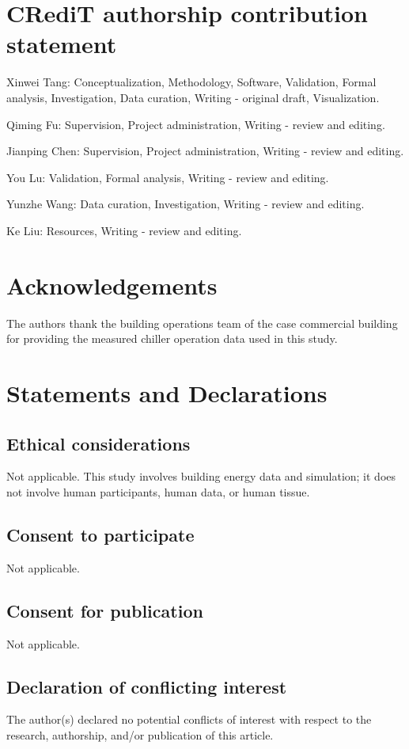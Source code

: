 \documentclass[preprint,12pt,number]{elsarticle}
\begin{document}
\section*{CRediT authorship contribution statement}
Xinwei Tang: Conceptualization, Methodology, Software, Validation, Formal analysis, Investigation, Data curation, Writing - original draft, Visualization.

Qiming Fu: Supervision, Project administration, Writing - review and editing.

Jianping Chen: Supervision, Project administration, Writing - review and editing.

You Lu: Validation, Formal analysis, Writing - review and editing.

Yunzhe Wang: Data curation, Investigation, Writing - review and editing.

Ke Liu: Resources, Writing - review and editing.

\section*{Acknowledgements}
The authors thank the building operations team of the case commercial building for providing the measured chiller operation data used in this study.

\section*{Statements and Declarations}

\subsection*{Ethical considerations}
Not applicable. This study involves building energy data and simulation; it does not involve human participants, human data, or human tissue.

\subsection*{Consent to participate}
Not applicable.

\subsection*{Consent for publication}
Not applicable.

\subsection*{Declaration of conflicting interest}
The author(s) declared no potential conflicts of interest with respect to the research, authorship, and/or publication of this article.
\end{document}
